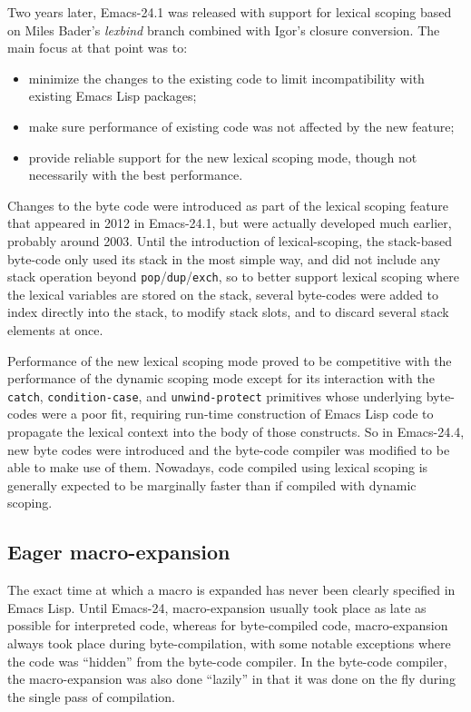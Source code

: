 \documentclass[format=acmsmall, review]{acmart}
\newcommand \Elisp {Emacs Lisp}
\begin{document}
Two years later, Emacs-24.1 was released with support for lexical
scoping based on Miles Bader's \emph{lexbind} branch combined with Igor's
closure conversion.  The main focus at that point was to:
\begin{itemize}
\item minimize the changes to the existing code to limit incompatibility
  with existing \Elisp{} packages;
\item make sure performance of existing code was not affected by the
  new feature;
\item provide reliable support for the new lexical scoping mode, though not
  necessarily with the best performance.
\end{itemize}
Changes to the byte code were introduced as part of the lexical scoping
feature that appeared in 2012 in Emacs-24.1, but were actually developed
much earlier, probably around 2003.  Until the introduction of
lexical-scoping, the stack-based byte-code only used its stack in the most
simple way, and did not include any stack operation beyond
\texttt{pop}/\texttt{dup}/\texttt{exch}, so to better support lexical
scoping where the lexical variables are stored on the stack, several
byte-codes were added to index directly into the stack, to modify stack
slots, and to discard several stack elements at once.

Performance of the new lexical scoping mode proved to be competitive with
the performance of the dynamic scoping mode except for its interaction with
the \texttt{catch}, \texttt{condition-case}, and \texttt{unwind-protect}
primitives whose underlying byte-codes were a poor fit, requiring run-time
construction of \Elisp{} code to propagate the lexical context into the body
of those constructs.
So in Emacs-24.4, new byte codes were introduced and
the byte-code compiler was modified to be able to make use of them.  Nowadays,
code compiled using lexical scoping is generally expected to be marginally
faster than if compiled with dynamic scoping.

\subsection{Eager macro-expansion} %
\label{sec:eager-macro-expansion}

The exact time at which a macro is expanded has never been clearly specified
in \Elisp{}.  Until Emacs-24, macro-expansion usually took place as late as
possible for interpreted code, whereas for byte-compiled code,
macro-expansion always took place during byte-compilation, with some notable
exceptions where the code was ``hidden'' from the byte-code compiler.  In the
byte-code compiler, the macro-expansion was also done ``lazily'' in that it was
done on the fly during the single pass of compilation.
\end{document}
